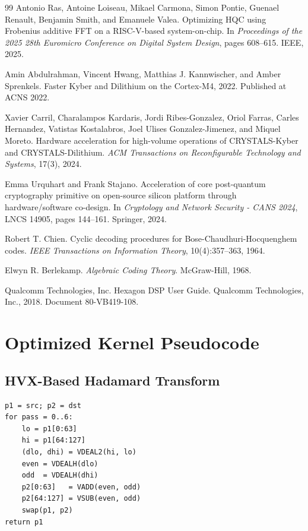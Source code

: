 \documentclass[12pt,a4paper]{report}
\begin{document}
\begin{thebibliography}{99}
Antonio Ras, Antoine Loiseau, Mikael Carmona, Simon Pontie, Guenael Renault, Benjamin Smith, and Emanuele Valea.
\newblock Optimizing HQC using Frobenius additive FFT on a RISC-V-based system-on-chip.
\newblock In \emph{Proceedings of the 2025 28th Euromicro Conference on Digital System Design}, pages 608--615. IEEE, 2025.

Amin Abdulrahman, Vincent Hwang, Matthias J. Kannwischer, and Amber Sprenkels.
\newblock Faster Kyber and Dilithium on the Cortex-M4, 2022.
\newblock Published at ACNS 2022.

Xavier Carril, Charalampos Kardaris, Jordi Ribes-Gonzalez, Oriol Farras, Carles Hernandez, Vatistas Kostalabros, Joel Ulises Gonzalez-Jimenez, and Miquel Moreto.
\newblock Hardware acceleration for high-volume operations of CRYSTALS-Kyber and CRYSTALS-Dilithium.
\newblock \emph{ACM Transactions on Reconfigurable Technology and Systems}, 17(3), 2024.

Emma Urquhart and Frank Stajano.
\newblock Acceleration of core post-quantum cryptography primitive on open-source silicon platform through hardware/software co-design.
\newblock In \emph{Cryptology and Network Security - CANS 2024}, LNCS 14905, pages 144--161. Springer, 2024.

Robert T. Chien.
\newblock Cyclic decoding procedures for Bose-Chaudhuri-Hocquenghem codes.
\newblock \emph{IEEE Transactions on Information Theory}, 10(4):357--363, 1964.

Elwyn R. Berlekamp.
\newblock \emph{Algebraic Coding Theory}.
\newblock McGraw-Hill, 1968.

Qualcomm Technologies, Inc.
\newblock Hexagon DSP User Guide.
\newblock Qualcomm Technologies, Inc., 2018. Document 80-VB419-108.

\end{thebibliography}

\appendix

\chapter{Optimized Kernel Pseudocode}
\label{app:algorithms}

\section{HVX-Based Hadamard Transform}
\begin{lstlisting}[caption={HVX-style Hadamard transform for RM decoding.}]
p1 = src; p2 = dst
for pass = 0..6:
    lo = p1[0:63]
    hi = p1[64:127]
    (dlo, dhi) = VDEAL2(hi, lo)
    even = VDEALH(dlo)
    odd  = VDEALH(dhi)
    p2[0:63]   = VADD(even, odd)
    p2[64:127] = VSUB(even, odd)
    swap(p1, p2)
return p1
\end{lstlisting}
\end{document}
